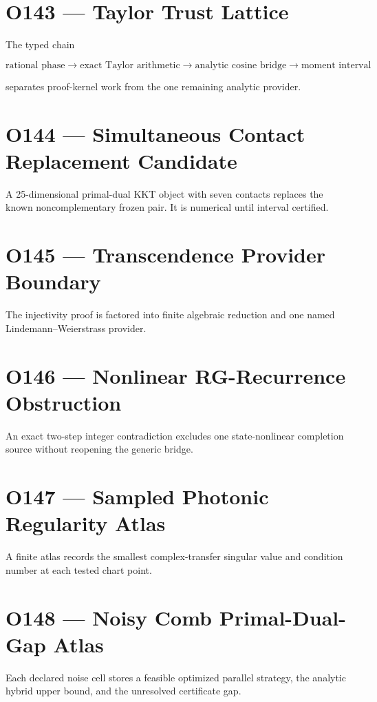 \documentclass[11pt,a4paper,openany]{report}
\begin{document}
\section{O143 --- Taylor Trust Lattice}

The typed chain

\[
\text{rational phase}
\to\text{exact Taylor arithmetic}
\to\text{analytic cosine bridge}
\to\text{moment interval}
\]

separates proof-kernel work from the one remaining analytic provider.

\section{O144 --- Simultaneous Contact Replacement Candidate}

A 25-dimensional primal-dual KKT object with seven contacts replaces the known noncomplementary frozen pair. It is numerical until interval certified.

\section{O145 --- Transcendence Provider Boundary}

The injectivity proof is factored into finite algebraic reduction and one named Lindemann--Weierstrass provider.

\section{O146 --- Nonlinear RG-Recurrence Obstruction}

An exact two-step integer contradiction excludes one state-nonlinear completion source without reopening the generic bridge.

\section{O147 --- Sampled Photonic Regularity Atlas}

A finite atlas records the smallest complex-transfer singular value and condition number at each tested chart point.

\section{O148 --- Noisy Comb Primal-Dual-Gap Atlas}

Each declared noise cell stores a feasible optimized parallel strategy, the analytic hybrid upper bound, and the unresolved certificate gap.
\end{document}
